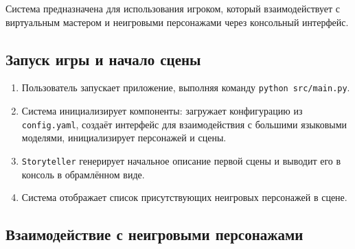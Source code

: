 Система предназначена для использования игроком, который взаимодействует с виртуальным мастером и неигровыми персонажами через консольный интерфейс.

\subsection*{Запуск игры и начало сцены}

\begin{enumerate}
	\item Пользователь запускает приложение, выполняя команду \texttt{python src/main.py}.
	
	\item Система инициализирует компоненты: загружает конфигурацию из \texttt{config.yaml}, создаёт интерфейс для взаимодействия с большими языковыми моделями, инициализирует персонажей и сцены.
	
	\item \texttt{Storyteller} генерирует начальное описание первой сцены и выводит его в консоль в обрамлённом виде.
	
	\item Система отображает список присутствующих неигровых персонажей в сцене.
\end{enumerate}

\subsection*{Взаимодействие с неигровыми персонажами}

